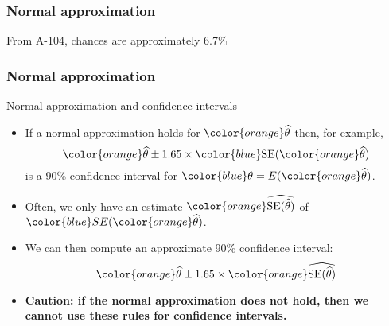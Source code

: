 \documentclass[handout]{beamer}
\begin{document}


   \begin{frame}
   \frametitle{Normal approximation}
   \begin{center}
   \end{center}
   From A-104, chances are approximately 6.7\%
   \end{frame}


   \begin{frame} \frametitle{Normal approximation}

    \begin{block}
     {Normal approximation and confidence intervals}
     \begin{itemize}
     \item If a normal approximation holds
       for ${\color{orange} \widehat{\theta}}$
       then, for example,
       $$
       {\color{orange} \widehat{\theta}} \pm 1.65 \times {\color{blue} \text{SE}}({\color{orange} \widehat{\theta}})
       $$
       is a 90\% confidence interval for ${\color{blue} \theta}=E({\color{orange} \widehat{\theta}})$.

      \item Often, we only have an estimate ${\color{orange} \widehat{ \text{SE}(\widehat{\theta})}}$ of ${\color{blue} SE}({\color{orange} \widehat{\theta}})$.
       \item We can then compute an approximate 90\% confidence interval:
       $$
       {\color{orange} \widehat{\theta}} \pm 1.65 \times {\color{orange} \widehat{ \text{SE}(\widehat{\theta})}}
      $$
      \item {\color{red} \bf Caution: if the normal approximation does not
     hold, then we
     cannot use these rules for confidence intervals.}

     \end{itemize}
   \end{block}
   \end{frame}
\end{document}
